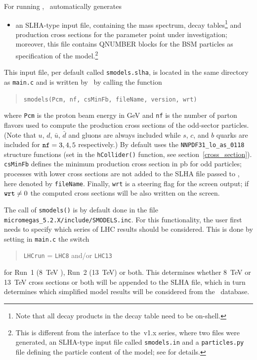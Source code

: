 \documentclass[12pt,a4paper]{article}
\begin{document}
For running \smodels, \micro\ automatically generates  
\begin{itemize}
\item an SLHA-type input file,  
containing the mass spectrum, decay tables\footnote{Note that all decay products in the decay table need to be on-shell.} and production cross sections for the parameter point under investigation; moreover, this file contains QNUMBER blocks for the BSM particles as specification of the model.\footnote{This is different from the interface to the \smodels\,v1.x series, 
where two files were generated, an SLHA-type input file called {\tt smodels.in} and a {\tt particles.py} file defining the particle content of the model; see \cite{Barducci:2016pcb} for details.}
\end{itemize}
%
This input file, per default called {\tt smodels.slha}, is located in the same directory as {\tt main.c} and 
is written by \micro\ by calling the function
\begin{quote}
  \verb|smodels(Pcm, nf, csMinFb, fileName, version, wrt)|
\end{quote}  
where \verb|Pcm| is the proton beam energy in GeV and \verb|nf| is the number of parton flavors used to compute the production cross sections of the odd-sector particles. 
(Note that $u$, $d$, $\bar{u}$, $\bar{d}$  and gluons are always included  while  $s$, $c$, and $b$ quarks are included for ${\tt nf} = 3,4,5$ respectively.)
By default \micro uses the \verb|NNPDF31_lo_as_0118| structure functions (set in the \verb|hCollider()| function, see section~\ref{cross_section}). 
{\tt csMinFb} defines the minimum production cross section in pb for odd  particles; processes with lower cross sections are not added to the SLHA file passed to \smodels, here denoted by  {\tt fileName}. 
Finally, {\tt wrt} is a steering flag for the screen output; if ${\tt wrt} \ne 0$  the computed cross sections will be also written on the screen. 

The call of \verb|smodels()| is by default done in the file \verb|micromegas_5.2.X/include/SMODELS.inc|.
For this functionality, the user first needs to specify which series of LHC results should be considered.
This is done by setting in {\tt main.c} the switch
 \begin{quote}
    \verb|LHCrun| = \verb|LHC8| and/or \verb|LHC13| 
 \end{quote}
 for Run~1 (8~TeV ), Run~2 (13~TeV) or both. This determines whether
 8~TeV or 13~TeV cross sections or both
 will be appended to the SLHA file, which in turn determines which
 simplified model results will be considered from the \smodels\
 database.
 
\end{document}
